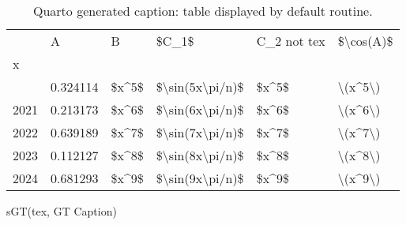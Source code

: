 \documentclass[
  12pt,
  a4paper,
  DIV=11,
  numbers=noendperiod]{scrartcl}
\newenvironment{Shaded}{\begin{snugshade}}{\end{snugshade}}
\newcommand{\NormalTok}[1]{\textcolor[rgb]{0.00,0.23,0.31}{#1}}
\newcommand{\StringTok}[1]{\textcolor[rgb]{0.13,0.47,0.30}{#1}}
\begin{document}
\begin{longtable}[]{@{}llllll@{}}

\caption{\label{tbl-tex}Quarto generated caption: table displayed by
default routine.}

\tabularnewline

\toprule\noalign{}
& A & B & \$C\_1\$ & C\_2 not tex & \$\textbackslash cos(A)\$ \\
x & & & & & \\
\midrule\noalign{}
\endhead
\bottomrule\noalign{}
\endlastfoot
2020 & 0.324114 & \$x\^{}5\$ &
\$\textbackslash sin(5x\textbackslash pi/n)\$ & \$x\^{}5\$ &
\textbackslash(x\^{}5\textbackslash) \\
2021 & 0.213173 & \$x\^{}6\$ &
\$\textbackslash sin(6x\textbackslash pi/n)\$ & \$x\^{}6\$ &
\textbackslash(x\^{}6\textbackslash) \\
2022 & 0.639189 & \$x\^{}7\$ &
\$\textbackslash sin(7x\textbackslash pi/n)\$ & \$x\^{}7\$ &
\textbackslash(x\^{}7\textbackslash) \\
2023 & 0.112127 & \$x\^{}8\$ &
\$\textbackslash sin(8x\textbackslash pi/n)\$ & \$x\^{}8\$ &
\textbackslash(x\^{}8\textbackslash) \\
2024 & 0.681293 & \$x\^{}9\$ &
\$\textbackslash sin(9x\textbackslash pi/n)\$ & \$x\^{}9\$ &
\textbackslash(x\^{}9\textbackslash) \\

\end{longtable}

\begin{Shaded}
\begin{Highlighting}[]
\NormalTok{sGT(tex, }\StringTok{\textquotesingle{}GT Caption\textquotesingle{}}\NormalTok{)}
\end{Highlighting}
\end{Shaded}
\end{document}

